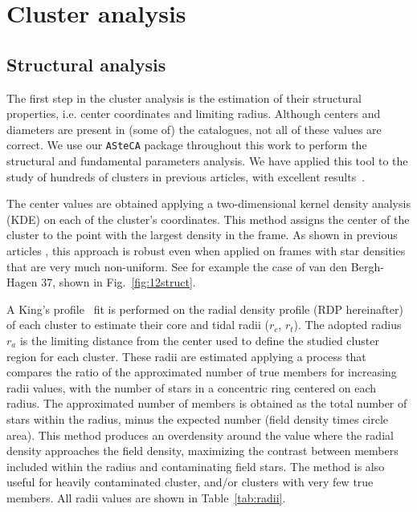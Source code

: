 \documentclass[draft]{aa}
\begin{document}
\section{Cluster analysis}
 \label{sec:clust_analy}

 \subsection{Structural analysis}

  The first step in the cluster analysis is the estimation of their structural
  properties, i.e. center coordinates and limiting radius. Although centers and
  diameters are present in (some of) the catalogues, not all of these values are
  correct. We use our \texttt{ASteCA} package throughout this
  work to perform the structural and fundamental parameters analysis. We have
  applied this tool to the study of hundreds of clusters in previous articles,
  with excellent results~\citep{Perren_2017,Perren_2020}.

  The center values are obtained applying a two-dimensional kernel density
  analysis (KDE) on each of the cluster's coordinates. This method assigns the
  center of the cluster to the point with the largest density in the frame. As
  shown in previous articles \citep{Perren_2015,Perren_2017,Perren_2020}, this
  approach is robust even when applied on frames with star densities that
  are very much non-uniform. See for example the case of van den Bergh-Hagen 37,
  shown in Fig.~\ref{fig:12struct}.

  A King's profile~\citep{King_1962} fit is performed on the radial
  density profile (RDP hereinafter) of each cluster to estimate their core and
  tidal radii ($r_{c}$, $r_{t}$). The adopted radius $r_{a}$ is the limiting
  distance from the center used to define the studied cluster region for each
  cluster. These radii are estimated applying a process that compares the
  ratio of the approximated number of true members for increasing radii values,
  with the number of stars in a concentric ring centered on each radius. The
  approximated number of members is obtained as the total number of stars within
  the radius, minus the expected number (field density times circle area). This
  method produces an overdensity around the value where the radial density
  approaches the field density, maximizing the contrast between members included
  within the radius and contaminating field stars. The method is also useful
  for heavily contaminated cluster, and/or clusters with very few true
  members. All radii values are shown in Table~\ref{tab:radii}.\\
\end{document}
